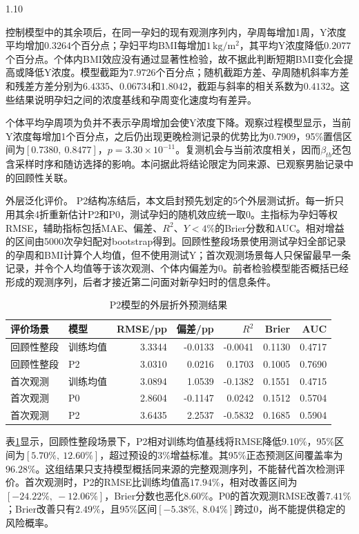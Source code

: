 \documentclass[12pt,a4paper]{ctexrep}
\numberwithin{equation}{section}
\newcommand{\hei}{\heiti}
\begin{document}
\begin{spacing}{1.10}
{			控制模型中的其余项后，在同一孕妇的现有观测序列内，孕周每增加1周，Y浓度平均增加$0.3264$个百分点；孕妇平均BMI每增加$1\,\mathrm{kg/m^2}$，其平均Y浓度降低$0.2077$个百分点。个体内BMI效应没有通过显著性检验，故不据此判断短期BMI变化会提高或降低Y浓度。模型截距为$7.9726$个百分点；随机截距方差、孕周随机斜率方差和残差方差分别为$6.4335$、$0.06734$和$1.8042$，截距与斜率的相关系数为$0.4132$。这些结果说明孕妇之间的浓度基线和孕周变化速度均有差异。

			个体平均孕周项为负并不表示孕周增加会使Y浓度下降。观察过程模型显示，当前Y浓度每增加1个百分点，之后仍出现更晚检测记录的优势比为$0.7909$，95\%置信区间为$[0.7380,\ 0.8477]$，$p=3.30\times10^{-11}$。复测机会与当前浓度相关，因而$\beta_{tb}$还包含采样时序和随访选择的影响。本问据此将结论限定为同来源、已观察男胎记录中的回顾性关联。

			{\hei 外层泛化评价。} P2结构冻结后，本文启封预先划定的5个外层测试折。每一折只用其余4折重新估计P2和P0，测试孕妇的随机效应统一取0。主指标为孕妇等权RMSE，辅助指标包括MAE、偏差、$R^2$、$Y<4\%$的Brier分数和AUC。相对增益的区间由5000次孕妇配对bootstrap得到。回顾性整段场景使用测试孕妇全部记录的孕周和BMI计算个人均值，但不使用测试Y；首次观测场景每人只保留最早一条记录，并令个人均值等于该次观测、个体内偏差为0。前者检验模型能否概括已经形成的观测序列，后者才接近第二问面对新孕妇时的信息条件。

			\begin{table}[H]
				\centering
				\caption{P2模型的外层折外预测结果}
				\label{tab:q1-generalization}
				\small
				\renewcommand{\arraystretch}{1.15}
				\begin{tabularx}{\textwidth}{Xlrrrrr}
					\toprule
					评价场景 & 模型 & RMSE/pp & 偏差/pp & $R^2$ & Brier & AUC \\
					\midrule
					回顾性整段 & 训练均值 & 3.3344 & -0.0133 & -0.0041 & 0.1130 & 0.4717 \\
					回顾性整段 & P2 & 3.0310 & 0.0216 & 0.1703 & 0.1005 & 0.7690 \\
					\midrule
					首次观测 & 训练均值 & 3.0894 & 1.0539 & -0.1382 & 0.1551 & 0.4715 \\
					首次观测 & P0 & 2.8604 & -0.1147 & 0.0242 & 0.1512 & 0.5704 \\
					首次观测 & P2 & 3.6435 & 2.2537 & -0.5832 & 0.1685 & 0.5904 \\
					\bottomrule
				\end{tabularx}
			\end{table}

			表\ref{tab:q1-generalization}显示，回顾性整段场景下，P2相对训练均值基线将RMSE降低$9.10\%$，95\%区间为$[5.70\%,\ 12.60\%]$，超过预设的$3\%$增益标准。其95\%正态预测区间覆盖率为$96.28\%$。这组结果只支持模型概括同来源的完整观测序列，不能替代首次检测评价。首次观测时，P2的RMSE比训练均值高$17.94\%$，相对改善区间为$[-24.22\%,\ -12.06\%]$，Brier分数也恶化$8.60\%$。P0的首次观测RMSE改善$7.41\%$；Brier改善只有$2.49\%$，且95\%区间$[-5.38\%,\ 8.04\%]$跨过0，尚不能提供稳定的风险概率。

}
\end{spacing}
\end{document}
